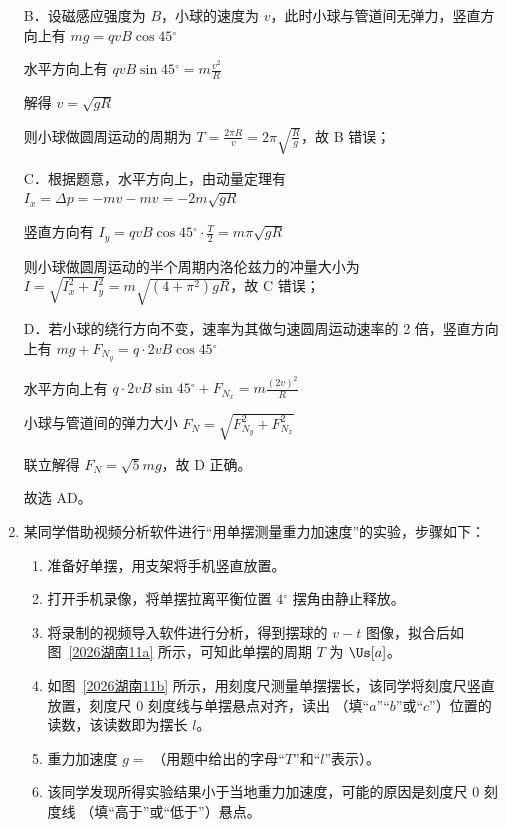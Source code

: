 \documentclass[\gkver]{gaokaozhenti}
\begin{document}
\begin{enumerate}
{B．设磁感应强度为 $B$，小球的速度为 $v$，此时小球与管道间无弹力，竖直方向上有 $mg = qvB \cos 45{^\circ}$

水平方向上有 $qvB \sin 45{^\circ} = m \frac{v^{2}}{R}$

解得 $v = \sqrt{gR}$

则小球做圆周运动的周期为 $T = \frac{2\pi R}{v} = 2\pi\sqrt{\frac{R}{g}}$，故 B 错误；

C．根据题意，水平方向上，由动量定理有 $I_x = \Delta p = -mv - mv = -2m\sqrt{gR}$

竖直方向有 $I_y = qvB \cos 45{^\circ} \cdot \frac{T}{2} = m\pi\sqrt{gR}$

则小球做圆周运动的半个周期内洛伦兹力的冲量大小为 $I = \sqrt{I_x^2 + I_y^2} = m\sqrt{(4 + \pi^2)gR}$，故 C 错误；

D．若小球的绕行方向不变，速率为其做匀速圆周运动速率的 2 倍，竖直方向上有 $mg + F_{N_y} = q \cdot 2vB \cos 45{^\circ}$

水平方向上有 $q \cdot 2vB \sin 45{^\circ} + F_{N_x} = m \frac{(2v)^2}{R}$

小球与管道间的弹力大小 $F_N = \sqrt{F_{N_y}^2 + F_{N_x}^2}$

联立解得 $F_N = \sqrt{5}mg$，故 D 正确。

故选 AD。
}
\item
某同学借助视频分析软件进行“用单摆测量重力加速度”的实验，步骤如下：
\begin{enumerate}
	\item
	准备好单摆，用支架将手机竖直放置。
	\item
	打开手机录像，将单摆拉离平衡位置 $4{^\circ}$ 摆角由静止释放。
\twopicture[numA=1, numB=2, showlabel=false, labelA=2026湖南11a, labelB=2026湖南11b, wA=6.5cm, wB=4.0cm]
{}{}
	\item
	将录制的视频导入软件进行分析，得到摆球的 $v-t$ 图像，拟合后如图~\ref{2026湖南11a} 所示，可知此单摆的周期 $T$ 为 \tkanswer{$0.6\pi$} $\Us[a]$。
	\item
	如图~\ref{2026湖南11b} 所示，用刻度尺测量单摆摆长，该同学将刻度尺竖直放置，刻度尺 0 刻度线与单摆悬点对齐，读出 （填“$a$”“$b$”或“$c$”）位置的读数，该读数即为摆长 $l$。
	\item
	重力加速度 $g =$ （用题中给出的字母“$T$”和“$l$”表示）。
	\item
	该同学发现所得实验结果小于当地重力加速度，可能的原因是刻度尺 0 刻度线 （填“高于”或“低于”）悬点。
\end{enumerate}


\end{enumerate}
\end{document}
